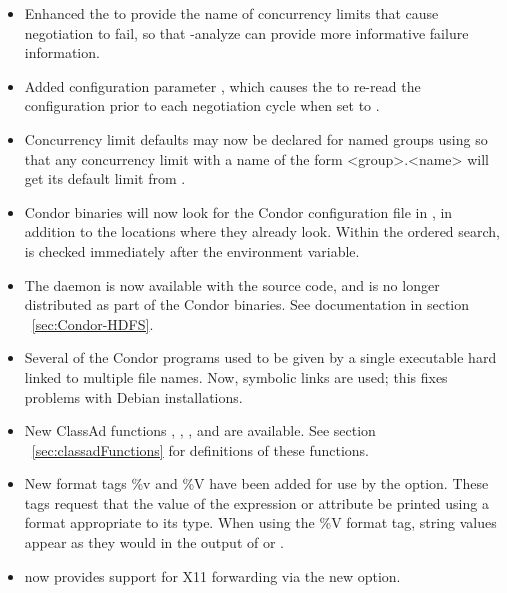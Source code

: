 \begin{itemize}

\item Enhanced the  to provide the name of 
concurrency limits that cause negotiation to fail, so that 
 -analyze can provide more informative failure information.

\item Added configuration parameter 
, which causes the
 to re-read the configuration prior to each
negotiation cycle when set to .

\item Concurrency limit defaults may now be declared for named groups
using  so that any
concurrency limit with a name of the form <group>.<name> will get its
default limit from .

\item Condor binaries will now look for the Condor configuration file in
, in addition to the locations where
they already look.
Within the ordered search,
 is checked immediately after the 
 environment variable.

\item The  daemon is now available with the source code,
and is no longer distributed as part of the Condor binaries.
See documentation in section ~\ref{sec:Condor-HDFS}.

\item Several of the Condor programs used to be given by a single executable
hard linked to multiple file names. 
Now, symbolic links are used; this fixes problems with Debian installations.

\item New ClassAd functions , ,
, and  are available.
See section ~\ref{sec:classadFunctions} for definitions of these functions.

\item New format tags \%v and \%V have been added for use by the
  option.
These tags request that the value of the expression or attribute be printed 
using a format appropriate to its type.
When using the \%V format tag, string values appear as they would in
the output of  or .

\item {} now provides support for X11 forwarding
via the new  option.

\end{itemize}

